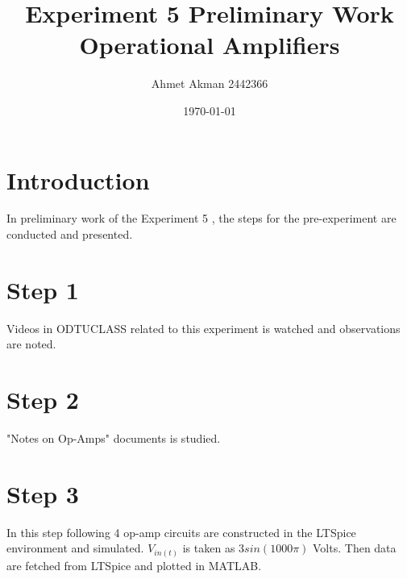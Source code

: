 \documentclass[letterpaper,12pt]{article}
\begin{document}
\title{Experiment 5 Preliminary Work \protect\\ Operational Amplifiers}
\author{Ahmet Akman 2442366 \protect\\}
\date{\today}
\maketitle


\section{Introduction} 
In preliminary work of the Experiment 5 , the steps for the pre-experiment are conducted and presented.
\section{Step 1}
Videos in  ODTUCLASS related to this experiment is watched and observations are noted.
\section{Step 2}
"Notes on Op-Amps" documents is studied.
\section{Step 3}
In this step following 4 op-amp circuits are constructed in the LTSpice environment and simulated. \(V_{in (t)}\) is taken as \(3sin(1000\pi)\) Volts. Then data are fetched from LTSpice and plotted in MATLAB.
\end{document}
